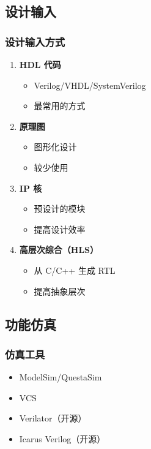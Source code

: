 \subsection{设计输入}

\subsubsection{设计输入方式}

\begin{enumerate}
  \item \textbf{HDL 代码}
    \begin{itemize}
      \item Verilog/VHDL/SystemVerilog
      \item 最常用的方式
    \end{itemize}

  \item \textbf{原理图}
    \begin{itemize}
      \item 图形化设计
      \item 较少使用
    \end{itemize}

  \item \textbf{IP 核}
    \begin{itemize}
      \item 预设计的模块
      \item 提高设计效率
    \end{itemize}

  \item \textbf{高层次综合（HLS）}
    \begin{itemize}
      \item 从 C/C++ 生成 RTL
      \item 提高抽象层次
    \end{itemize}
\end{enumerate}

\subsection{功能仿真}

\subsubsection{仿真工具}

\begin{itemize}
  \item ModelSim/QuestaSim
  \item VCS
  \item Verilator（开源）
  \item Icarus Verilog（开源）
\end{itemize}

